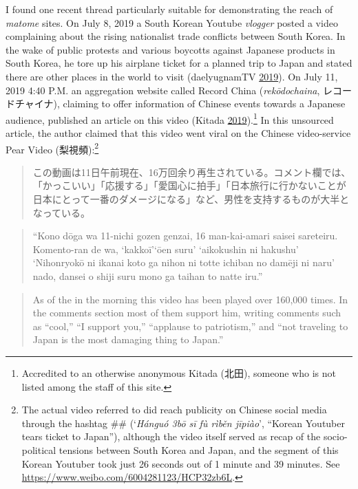 \documentclass[10pt,british,A4paper,,openany]{memoir}
\begin{document}
I found one recent thread particularly suitable for demonstrating the
reach of \emph{matome} sites. On July 8, 2019 a South Korean Youtube
\emph{vlogger} posted a video complaining about the rising nationalist
trade conflicts between South Korea. In the wake of public protests and
various boycotts against Japanese products in South Korea, he tore up
his airplane ticket for a planned trip to Japan and stated there are
other places in the world to visit (daelyugnamTV
\protect\hyperlink{ref-daelyugnamtv_eng._2019}{2019}). On July 11, 2019
4:40 P.M. an aggregation website called Record China
(\emph{rekōdochaina}, レコードチャイナ), claiming to offer information
of Chinese events towards a Japanese audience, published an article on
this video (Kitada
\protect\hyperlink{ref-kitada_eng._2019}{2019}).\footnote{Accredited to
  an otherwise anonymous Kitada (北田), someone who is not listed among
  the staff of this site.} In this unsourced article, the author claimed
that this video went viral on the Chinese video-service Pear Video
(梨視頻):\footnote{The actual video referred to did reach publicity on
  Chinese social media through the hashtag
  \#\# (`\emph{Hánguó \zhu3bō 
  sī fù rìběn jīpiào}', ``Korean Youtuber tears ticket to Japan''),
  although the video itself served as recap of the socio-political
  tensions between South Korea and Japan, and the segment of this Korean
  Youtuber took just 26 seconds out of 1 minute and 39 minutes. See
  \url{https://www.weibo.com/6004281123/HCP32zb6L}.}

\begin{quote}
この動画は11日午前現在、16万回余り再生されている。コメント欄では、「かっこいい」「応援する」「愛国心に拍手」「日本旅行に行かないことが日本にとって一番のダメージになる」など、男性を支持するものが大半となっている。
\end{quote}

\begin{quote}
``Kono dōga wa 11-nichi gozen genzai, 16 man-kai-amari saisei sareteiru.
Komento-ran de wa, `kakkoī'`ōen suru' `aikokushin ni hakushu'
`Nihonryokō ni ikanai koto ga nihon ni totte ichiban no damēji ni naru'
nado, dansei o shiji suru mono ga taihan to natte iru.''
\end{quote}

\begin{quote}
As of the  in the morning this video has been played over
160,000 times. In the comments section most of them support him, writing
comments such as ``cool,'' ``I support you,'' ``applause to
patriotism,'' and ``not traveling to Japan is the most damaging thing to
Japan.''
\end{quote}
\end{document}
